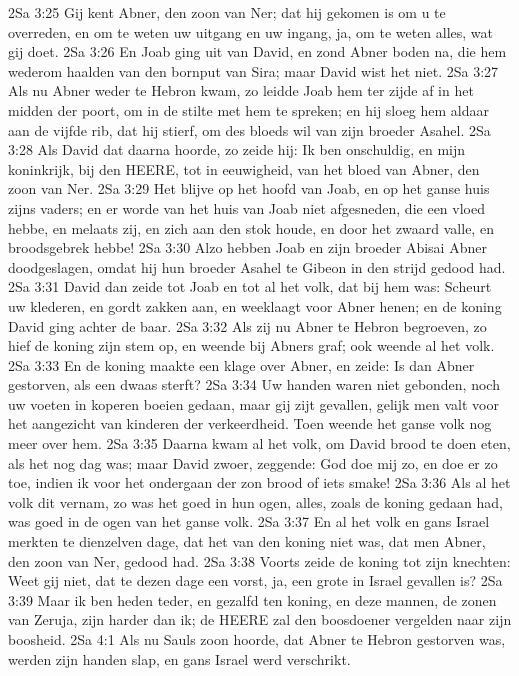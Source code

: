 2Sa 3:25  Gij kent Abner, den zoon van Ner; dat hij gekomen is om u te overreden, en om te weten uw uitgang en uw ingang, ja, om te weten alles, wat gij doet.
2Sa 3:26  En Joab ging uit van David, en zond Abner boden na, die hem wederom haalden van den bornput van Sira; maar David wist het niet.
2Sa 3:27  Als nu Abner weder te Hebron kwam, zo leidde Joab hem ter zijde af in het midden der poort, om in de stilte met hem te spreken; en hij sloeg hem aldaar aan de vijfde rib, dat hij stierf, om des bloeds wil van zijn broeder Asahel.
2Sa 3:28  Als David dat daarna hoorde, zo zeide hij: Ik ben onschuldig, en mijn koninkrijk, bij den HEERE, tot in eeuwigheid, van het bloed van Abner, den zoon van Ner.
2Sa 3:29  Het blijve op het hoofd van Joab, en op het ganse huis zijns vaders; en er worde van het huis van Joab niet afgesneden, die een vloed hebbe, en melaats zij, en zich aan den stok houde, en door het zwaard valle, en broodsgebrek hebbe!
2Sa 3:30  Alzo hebben Joab en zijn broeder Abisai Abner doodgeslagen, omdat hij hun broeder Asahel te Gibeon in den strijd gedood had.
2Sa 3:31  David dan zeide tot Joab en tot al het volk, dat bij hem was: Scheurt uw klederen, en gordt zakken aan, en weeklaagt voor Abner henen; en de koning David ging achter de baar.
2Sa 3:32  Als zij nu Abner te Hebron begroeven, zo hief de koning zijn stem op, en weende bij Abners graf; ook weende al het volk.
2Sa 3:33  En de koning maakte een klage over Abner, en zeide: Is dan Abner gestorven, als een dwaas sterft?
2Sa 3:34  Uw handen waren niet gebonden, noch uw voeten in koperen boeien gedaan, maar gij zijt gevallen, gelijk men valt voor het aangezicht van kinderen der verkeerdheid. Toen weende het ganse volk nog meer over hem.
2Sa 3:35  Daarna kwam al het volk, om David brood te doen eten, als het nog dag was; maar David zwoer, zeggende: God doe mij zo, en doe er zo toe, indien ik voor het ondergaan der zon brood of iets smake!
2Sa 3:36  Als al het volk dit vernam, zo was het goed in hun ogen, alles, zoals de koning gedaan had, was goed in de ogen van het ganse volk.
2Sa 3:37  En al het volk en gans Israel merkten te dienzelven dage, dat het van den koning niet was, dat men Abner, den zoon van Ner, gedood had.
2Sa 3:38  Voorts zeide de koning tot zijn knechten: Weet gij niet, dat te dezen dage een vorst, ja, een grote in Israel gevallen is?
2Sa 3:39  Maar ik ben heden teder, en gezalfd ten koning, en deze mannen, de zonen van Zeruja, zijn harder dan ik; de HEERE zal den boosdoener vergelden naar zijn boosheid.
2Sa 4:1  Als nu Sauls zoon hoorde, dat Abner te Hebron gestorven was, werden zijn handen slap, en gans Israel werd verschrikt.

